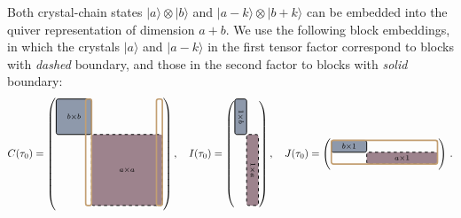 \documentclass[10pt]{article}
\theoremstyle{definition}
\numberwithin{equation}{section}
\begin{document}
Both crystal-chain states $|a\rangle\otimes|b\rangle$ and $|a-k\rangle\otimes|b+k\rangle$ can be embedded into the quiver representation of dimension $a+b$.
We use the following block embeddings, in which the crystals $|a\rangle$ and $|a-k\rangle$ in the first tensor factor correspond to blocks with \emph{dashed} boundary, and those in the second factor to blocks with \emph{solid} boundary:
\begin{subequations}
\begin{equation}\label{matrix_a}
	C(\tau_0)=\left(\!\!\!\begin{array}{c}
		\begin{tikzpicture}[scale=0.4]
			\draw[thick, fill=white!20!color4, rounded corners=2] (0,0) -- (3,0) -- (3,-3) -- (0,-3) -- cycle;
			\draw[thick, dashed, fill=white!20!color2, rounded corners=2] (3,-3) -- (9,-3) -- (9,-9) -- (3,-9) -- cycle;
			\draw[color5, line width=0.5mm, rounded corners=2] (2.5,0) -- (3,0) -- (3,-9) -- (2.5,-9) -- cycle;
			\draw[color5, line width=0.5mm, rounded corners=2] (8.5,0) -- (9,0) -- (9,-9) -- (8.5,-9) -- cycle;  
			\node at (1.5,-1.5) {$\scriptstyle b\times b$};
			\node at (6,-6) {$\scriptstyle a\times a$};
		\end{tikzpicture}
	\end{array}\!\!\!\right),\quad I(\tau_0)=\left(\!\!\!\begin{array}{c}
		\begin{tikzpicture}[scale=0.4]
			\draw[thick, fill=white!20!color4, rounded corners=2] (0,0) -- (1,0) -- (1,-3) -- (0,-3) -- cycle;
			\draw[thick, dashed, fill=white!20!color2, rounded corners=2] (1,-3) -- (2,-3) -- (2,-9) -- (1,-9) -- cycle; 
			\node[rotate=-90] at (0.5,-1.5) {$\scriptstyle 1\times b$};
			\node[rotate=-90] at (1.5,-6) {$\scriptstyle 1\times a$};
		\end{tikzpicture}
	\end{array}\!\!\!\right),\quad J(\tau_0)=\left(\!\!\!\begin{array}{c}
		\begin{tikzpicture}[scale=0.4]
			\draw[thick, fill=white!20!color4, rounded corners=2] (0,0) -- (3,0) -- (3,-1) -- (0,-1) -- cycle;
			\draw[thick, dashed, fill=white!20!color2, rounded corners=2] (3,-1) -- (9,-1) -- (9,-2) -- (3,-2) -- cycle;
			\draw[color5, line width=0.5mm, rounded corners=2] (0,0) -- (9,0) -- (9,-2) -- (0,-2) -- cycle;
			\node at (1.5,-0.5) {$\scriptstyle b\times 1$};
			\node at (6,-1.5) {$\scriptstyle a\times 1$};
		\end{tikzpicture}
	\end{array}\!\!\!\right)\,.

\end{equation}
\end{subequations}
\end{document}
